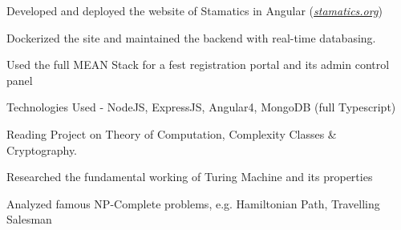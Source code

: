 \documentclass[]{deedy-resume-openfont}
\begin{document}
\begin{minipage}[t]{0.70\textwidth}
\vspace{0.1cm}
\begin{tightemize}
  \item Developed and deployed the website of Stamatics in Angular (\href{http://stamatics.org}{\textit{stamatics.org}})
  \item Dockerized the site and maintained the backend with real-time databasing.
\end{tightemize}
\begin{tightemize}
  \item Used the full MEAN Stack for a fest registration portal and its admin control panel
  \item Technologies Used - NodeJS, ExpressJS, Angular4, MongoDB (full Typescript)
\end{tightemize}

\vspace{0.0cm}
\begin{tightemize}
  \item Reading Project on Theory of Computation, Complexity Classes \& Cryptography.
  \item Researched the fundamental working of Turing Machine and its properties
  \item Analyzed famous NP-Complete problems, e.g. Hamiltonian Path, Travelling Salesman
\end{tightemize}




\end{minipage}
\end{document}
